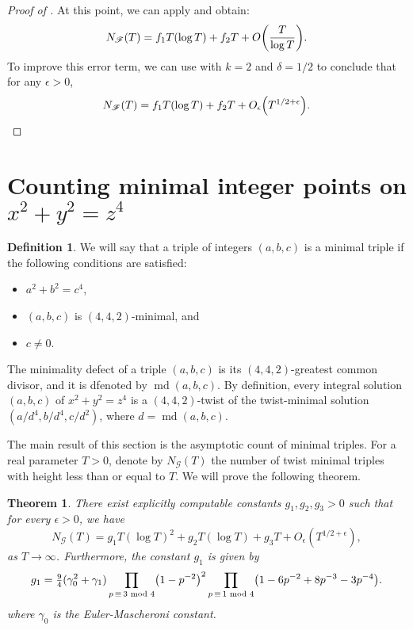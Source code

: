 \documentclass[12pt]{amsart}
\newcounter{counter}[section] %
\numberwithin{equation}{section} %
\newtheorem{theorem}[counter]{Theorem}
\theoremstyle{definition} \newtheorem{definition}[counter]{Definition}
\theoremstyle{remark} \newtheorem{nonexam}[counter]{Non-example}
\newcommand{\FF}{\mathscr{F}} %
\newcommand{\GG}{\mathscr{G}}
\newcommand{\md}{\text{ mod }} %
\newcommand{\paren}[1]{\left( #1 \right)} %
\newcommand{\cdef}[1]{\textsf{#1}} %
\let\originalleft\left \let\originalright\right
\renewcommand{\left}{\mathopen{}\mathclose\bgroup\originalleft}
\renewcommand{\right}{\aftergroup\egroup\originalright}
\DeclareMathOperator{\mind}{md} %
\begin{document}
\begin{proof}[Proof of {}]
    At this point, we can apply  and obtain:
    \begin{equation*}
        N_{\FF}(T) = f_1 T(\log T) + f_2T + O\left(\dfrac{T}{\log T}\right).
      \end{equation*}
      To improve this error term, we can use  with $k = 2$
      and $\delta = 1/2$ to conclude that for any $\epsilon > 0$,
      \begin{equation*}
        N_{\FF}(T) = f_1 T(\log T) + f_2T + O_\epsilon\left(T^{1/2 + \epsilon}\right).
      \end{equation*}
\end{proof}
    

\section{Counting minimal integer points on $x^2 + y^2 = z^4$}
\label{sec:counting-min-sols}

\begin{definition}
  \label{def:minimal-triple}
  We will say that a triple of integers $(a,b,c)$ is a
  \cdef{minimal triple} if the following conditions are satisfied:
  \begin{itemize}
   \item $a^2 + b^2 = c^4$,
   \item $(a,b,c)$ is $(4,4,2)$-minimal, and
   \item $c\neq0$.
  \end{itemize}
  The \cdef{minimality defect} of a triple $(a,b,c)$ is its $(4,4,2)$-greatest
  common divisor, and it is dfenoted by $\mind(a,b,c)$. By definition, every
  integral solution $(a,b,c)$ of $x^2 + y^2 = z^4$ is a $(4,4,2)$-twist of the
  twist-minimal solution $(a/d^4, b/d^4, c/d^2)$, where $d = \mind(a,b,c)$.
\end{definition}

The main result of this section is the asymptotic count of minimal triples. For
a real parameter $T > 0$, denote by $N_\GG(T)$ the number of twist minimal
triples with height less than or equal to $T$. We will prove the following
theorem.

\begin{theorem}
    \label{thm:GG-count}
    There exist explicitly computable constants $g_1, g_2, g_3 > 0$ such that for
    every $\epsilon > 0$, we have
    $$N_{\GG}(T) = g_1 T(\log T)^2 + g_2T(\log T) + g_3T + O_\epsilon(T^{1/2+\epsilon}),$$
    as $T \to \infty$. Furthermore, the constant $g_1$ is given by
    \begin{equation*}
      g_1 = \tfrac{9}{4}(\gamma_0^2+\gamma_1)\prod_{p \, \equiv\, 3 \md 4}\paren{1-p^{-2}}^2
      \prod_{p \, \equiv\, 1 \md 4}\paren{1 -6p^{-2}+8p^{-3}-3p^{-4}}.
      \end{equation*}
      where $\gamma_0$ is the Euler-Mascheroni constant.
\end{theorem}
\end{document}
